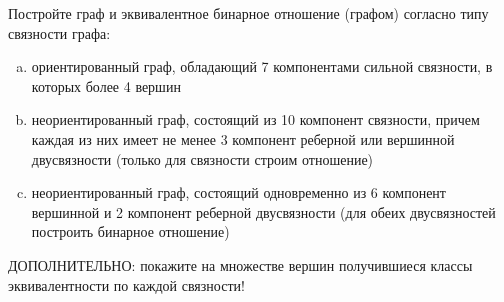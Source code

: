 \question 
Постройте граф и эквивалентное бинарное отношение (графом) согласно типу связности графа:\\
\begin{enumerate} [a)]\setcounter{enumi}{0}
\item ориентированный граф, обладающий 7 компонентами сильной связности, в которых более 4 вершин
\item неориентированный граф, состоящий из 10 компонент связности, причем каждая из них имеет не менее 3 компонент реберной или вершинной двусвязности (только для связности строим отношение)
\item неориентированный граф, состоящий одновременно из 6 компонент вершинной и 2 компонент реберной двусвязности (для обеих двусвязностей построить бинарное отношение)
\end{enumerate} 
ДОПОЛНИТЕЛЬНО: покажите на множестве вершин получившиеся классы эквивалентности по каждой связности!